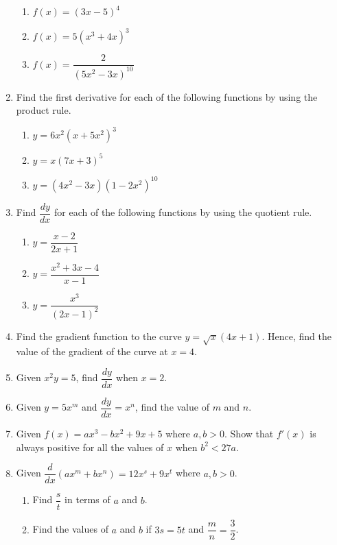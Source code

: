 \documentclass{report}
\begin{document}
\begin{multicols}{2}
\begin{enumerate}
\begin{enumerate}
                        \item $f(x)={(3x-5)}^{4}$
                        \item $f(x)=5{(x^{3}+4x)}^{3}$
                        \item $f(x)={\dfrac{2}{{(5x^{2}-3x)}^{10}}}$
                  \end{enumerate}
            \item Find the first derivative for each of the following functions by using the
                  product rule.
                  \begin{enumerate}
                        \item $y=6x^{2}{(x+5x^{2})}^{3}$
                        \item $y=x{(7x+3)}^{5}$
                        \item $y={(4x^{2}-3x)(1-2x^{2})}^{10}$
                  \end{enumerate}
            \item Find $\dfrac{dy}{dx}$ for each of the following functions by using the quotient
                  rule.
                  \begin{enumerate}
                        \item $y={\dfrac{x-2}{2x+1}}$
                        \item $y={\dfrac{x^{2}+3x-4}{x-1}}$
                        \item $y={\dfrac{x^{3}}{{(2x-1)}^{2}}}$
                  \end{enumerate}
            \item Find the gradient function to the curve $y = \sqrt{x}(4x+1)$. Hence, find the
                  value of the gradient of the curve at $x = 4$.
            \item Given $x^2y = 5$, find $\dfrac{dy}{dx}$ when $x = 2$.
            \item Given $y = 5x^m$ and $\dfrac{dy}{dx} = x^n$, find the value of $m$ and $n$.
            \item Given $f(x) = ax^3 - bx^2 + 9x + 5$ where $a, b > 0$. Show that $f'(x)$ is
                  always positive for all the values of $x$ when $b^2 < 27a$.
            \item Given $\dfrac{d}{dx}(ax^m + bx^n) = 12x^s + 9x^t$ where $a, b > 0$.
                  \begin{enumerate}
                        \item Find $\dfrac{s}{t}$ in terms of $a$ and $b$.
                        \item Find the values of $a$ and $b$ if $3s = 5t$ and $\dfrac{m}{n} = \dfrac{3}{2}$.

\end{enumerate}
\end{enumerate}
\end{multicols}
\end{document}
